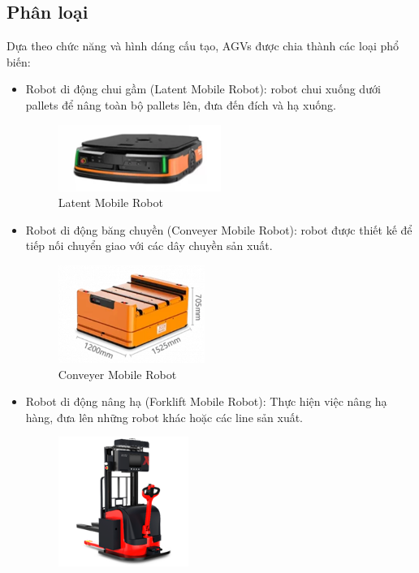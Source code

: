     \subsection{Phân loại}
    \hspace*{0.6cm} Dựa theo chức năng và hình dáng cấu tạo, AGVs được chia thành các loại phổ biến:
    \begin{itemize}
        \item Robot di động chui gầm (Latent Mobile Robot): robot chui xuống dưới pallets để nâng toàn bộ pallets lên, đưa đến đích và hạ xuống.
            \begin{figure}[H]
                \centering
                \includegraphics[width=0.5\textwidth]{pictures/chapter1/chapter1_pic_1.png}
                \caption{Latent Mobile Robot}
                \label{chap1_pic1}
            \end{figure}
        \item Robot di động băng chuyền (Conveyer Mobile Robot): robot được thiết kế để tiếp nối chuyển giao với các dây chuyền sản xuất.
            \begin{figure}[H]
                \centering
                \includegraphics[width=0.45\textwidth]{pictures/chapter1/chapter1_pic_2.png}
                \caption{Conveyer Mobile Robot}
                \label{chap1_pic2}
            \end{figure}
        \item Robot di động nâng hạ (Forklift Mobile Robot): Thực hiện việc nâng hạ hàng, đưa lên những robot khác hoặc các line sản xuất.
            \begin{figure}[H]
                \centering
                \includegraphics[width=0.4\textwidth]{pictures/chapter1/chapter1_pic_3.png}

\end{figure}
\end{itemize}
